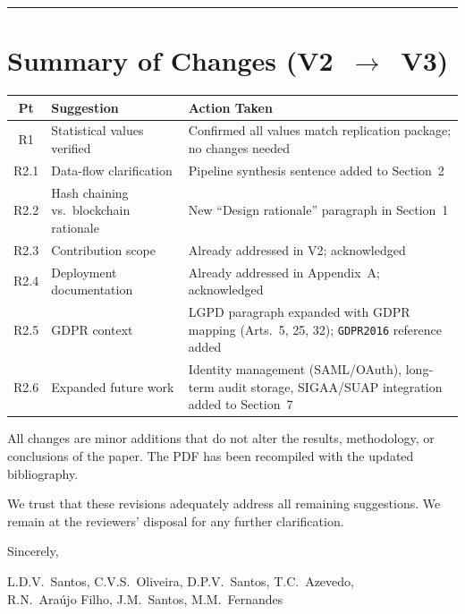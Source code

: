 \documentclass[11pt,a4paper]{article}
\begin{document}
\bigskip
\hrule
\bigskip

\section*{Summary of Changes (V2~$\to$~V3)}

\begin{table}[h]
\centering
\small
\begin{tabular}{|c|p{4.5cm}|p{7.5cm}|}
\hline
\textbf{Pt} & \textbf{Suggestion} & \textbf{Action Taken} \\
\hline
R1 & Statistical values verified & Confirmed all values match replication package; no changes needed \\
\hline
R2.1 & Data-flow clarification & Pipeline synthesis sentence added to Section~2 \\
\hline
R2.2 & Hash chaining vs.\ blockchain rationale & New ``Design rationale'' paragraph in Section~1 \\
\hline
R2.3 & Contribution scope & Already addressed in V2; acknowledged \\
\hline
R2.4 & Deployment documentation & Already addressed in Appendix~A; acknowledged \\
\hline
R2.5 & GDPR context & LGPD paragraph expanded with GDPR mapping (Arts.~5, 25, 32); \texttt{GDPR2016} reference added \\
\hline
R2.6 & Expanded future work & Identity management (SAML/OAuth), long-term audit storage, SIGAA/SUAP integration added to Section~7 \\
\hline
\end{tabular}
\end{table}

\bigskip

\noindent All changes are minor additions that do not alter the results, methodology, or conclusions of the paper. The PDF has been recompiled with the updated bibliography.

\bigskip

\noindent We trust that these revisions adequately address all remaining suggestions. We remain at the reviewers' disposal for any further clarification.

\bigskip
\noindent Sincerely,

\medskip
\noindent L.D.V.~Santos, C.V.S.~Oliveira, D.P.V.~Santos, T.C.~Azevedo,\\
R.N.~Araújo Filho, J.M.~Santos, M.M.~Fernandes
\end{document}
